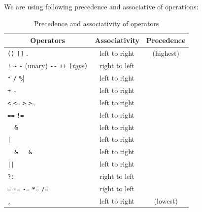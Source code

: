 \documentclass{report}
\newcommand{\+}{}
\begin{document}
    We are using following precedence and associative of operations:
    \begin{table}[t]
        \begin{center}
            \begin{tabular}{@{}l|c|c}
                \hline
                \multicolumn{1}{c|}{\sc Operators}
                &
                    {\sc Associativity}
                &
                    {\sc Precedence}
                \\ \hline
                \verb|()| \quad \verb|[]| \quad .
                &
                left to right
                &
                (highest)
                \\
                \verb|!| \quad \verb|~| \quad \verb|-| (unary)
                \quad \verb|--| \quad \verb|++|
                \quad \verb|(|\emph{type}\verb|)|
                &
                right to left
                \\
                \verb|*| \quad \verb|/| \quad \verb|%|
                &
                left to right
                \\
                \verb|+| \quad \verb|-|
                &
                left to right
                \\
                \verb|<| \quad \verb|<=| \quad \verb|>| \quad \verb|>=|
                &
                left to right
                \\
                \verb|==| \quad \verb|!=|
                &
                left to right
                \\
                \verb|  &  |
                &
                left to right
                \\
                \verb$|$
                &
                left to right
                \\
                \verb|  &   &  |
                &
                left to right
                \\
                \verb$||$
                &
                left to right
                \\
                \verb$?:$
                &
                right to left
                \\
                \verb|=| \quad \verb|+=| \quad \verb|-=| \quad \verb|*=| \quad \verb|/=|
                &
                right to left
                \\
                \verb|,|
                &
                left to right
                &
                (lowest)
                \\ \hline
            \end{tabular}
        \end{center}
        \caption{Precedence and associativity of operators}
        \label{TAB:precedence}
    \end{table}
\end{document}
